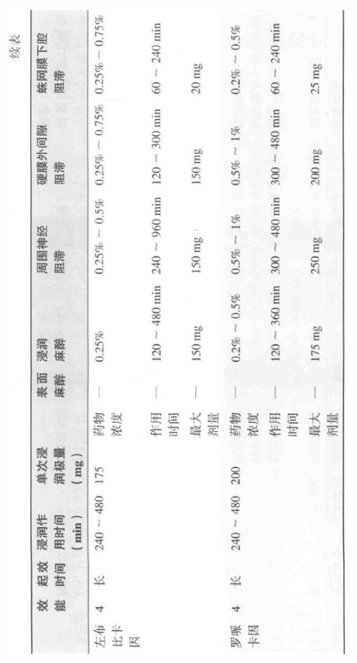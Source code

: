 \documentclass[10pt]{article}
\begin{document}
\begin{center}
\includegraphics[max width=\textwidth]{2024_07_05_645bb794a4d4f32ee0c8g-341}
\end{center}
\end{document}
